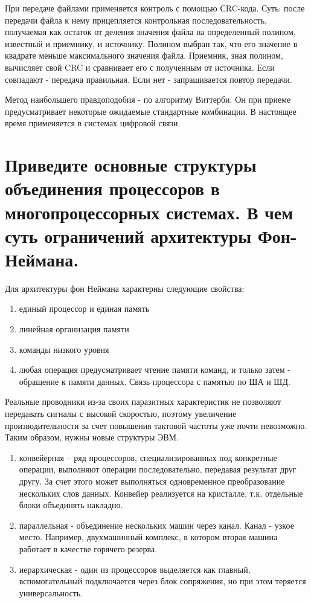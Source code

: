 \documentclass[unicode, 12pt, a4paper, oneside]{article}
\begin{document}
При передаче файлами применяется контроль с помощью СRC-кода. Суть: после передачи файла к нему прицепляется контрольная последовательность, получаемая как остаток от деления значения файла на определенный полином, известный и приемнику, и источнику. Полином выбран так, что его значение в квадрате меньше максимального значения файла. Приемник, зная полином, вычисляет свой CRC и сравнивает его с полученным от источника. Если совпадают - передача правильная. Если нет - запрашивается повтор передачи.

Метод наибольшего правдоподобия - по алгоритму Виттерби. Он при приеме предусматривает некоторые ожидаемые стандартные комбинации. В настоящее время применяется в системах цифровой связи.

\section{Приведите основные структуры объединения процессоров в многопроцессорных системах. В чем суть ограничений архитектуры Фон-Неймана.}

Для архитектуры фон Неймана характерны следующие свойства:
\begin{enumerate}
\item единый процессор и единая память
\item линейная организация памяти
\item команды низкого уровня
\item любая операция предусматривает чтение памяти команд, и только затем - обращение к памяти данных. Связь процессора с памятью по ША и ШД.
\end{enumerate}

Реальные проводники из-за своих паразитных характеристик не позволяют передавать сигналы с высокой скоростью, поэтому увеличение производительности за счет повышения тактовой частоты уже почти невозможно. Таким образом, нужны новые структуры ЭВМ.
\begin{enumerate}
\item конвейерная – ряд процессоров, специализированных под конкретные операции, выполняют операции последовательно, передавая результат друг другу. За счет этого может выполняться одновременное преобразование нескольких слов данных. Конвейер реализуется на кристалле, т.к. отдельные блоки объединять накладно.
\item параллельная - объединение нескольких машин через канал. Канал - узкое место. Например, двухмашинный комплекс, в котором вторая машина работает в качестве горячего резерва.
\item иерархическая - один из процессоров выделяется как главный, вспомогательный подключается через блок сопряжения, но при этом теряется универсальность.
\end{enumerate}
\end{document}
